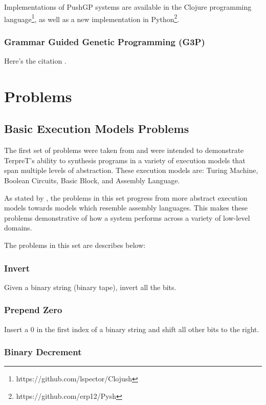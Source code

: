 Implementations of PushGP systems are available in the Clojure programming language\footnote{https://github.com/lspector/Clojush}, as well as a new implementation in Python\footnote{https://github.com/erp12/Pysh}.

\subsubsection{Grammar Guided Genetic Programming (G3P)}

Here's the citation \cite{Forstenlechner:2017:eurogp}.


\section{Problems}
\subsection{Basic Execution Models Problems}
The first set of problems were taken from \cite{Gaunt2016} and were intended to demonstrate TerpreT's ability to synthesis programs in a variety of execution models that span multiple levels of abstraction. These execution models are: Turing Machine, Boolean Circuits, Basic Block, and Assembly Language. 

As stated by \cite{Gaunt2016}, the problems in this set progress from more abstract execution models towards models which resemble assembly languages. This makes these problems demonstrative of how a system performs across a variety of low-level domains. 
 
The problems in this set are describes below:

\subsubsection{Invert}

Given a binary string (binary tape), invert all the bits.

\subsubsection{Prepend Zero}

Insert a $0$ in the first index of a binary string and shift all other bits to the right.

\subsubsection{Binary Decrement}

